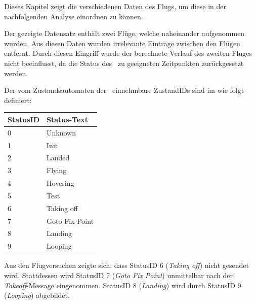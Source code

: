 
Dieses Kapitel zeigt die verschiedenen Daten des Flugs, um diese in der nachfolgenden Analyse einordnen zu können.

Der gezeigte Datensatz enthält zwei Flüge, welche naheinander aufgenommen wurden. Aus diesen Daten wurden irrelevante Einträge zwischen den Flügen entfernt. Durch diesen Eingriff wurde der berechnete Verlauf des zweiten Fluges nicht beeinflusst, da die Status des \Quad\ zu geeigneten Zeitpunkten zurückgesetzt werden.

Der vom Zustandsautomaten der \Ar\ einnehmbare ZustandIDs sind im  wie folgt definiert:
\begin{table}[!ht]
\begin{tabular}{ll}
StatusID & Status-Text    \\ \hline
0        & Unknown        \\
1        & Init           \\
2        & Landed         \\
3        & Flying         \\
4        & Hovering       \\
5        & Test           \\
6        & Taking off     \\
7        & Goto Fix Point \\
8        & Landing        \\
9        & Looping       
\end{tabular}
\end{table}
\FloatBarrier
Aus den Flugversuchen zeigte sich, dass StatusID 6 (\textit{Taking off}) nicht gesendet wird. Stattdessen wird StatusID 7 (\textit{Goto Fix Point}) unmittelbar nach der \textit{Takeoff}-Message eingenommen. StatusID 8 (\textit{Landing}) wird durch StatusID 9 (\textit{Looping}) abgebildet. 


